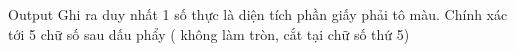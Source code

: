 Output
Ghi ra duy nhất 1 số thực là diện tích phần giấy phải tô màu. Chính xác tới 5 chữ số sau dấu phẩy ( không làm tròn, cắt tại chữ số thứ 5)